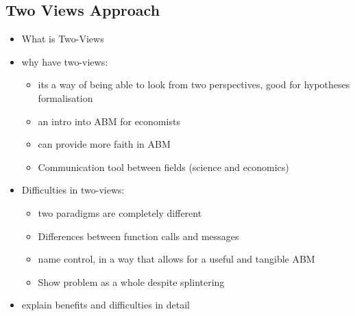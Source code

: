 \documentclass{article}
\begin{document}
\subsection{Two Views Approach} \label{twoviewsapproach} 

\begin{itemize}
  \item What is Two-Views
  \item why have two-views: \begin{itemize}
  \item its a way of being able to look from two perspectives, good for hypotheses formalisation 
  \item an intro into ABM for economists
  \item can provide more faith in ABM 
  \item Communication tool between fields (science and economics)
\end{itemize}
  \item Difficulties in two-views: \begin{itemize}
  \item two paradigms are completely different
  \item Differences between function calls and messages
  \item name control, in a way that allows for a useful and tangible ABM
  \item Show problem as a whole despite splintering
\end{itemize}
  \item explain benefits and difficulties in detail 
\end{itemize}
\end{document}

